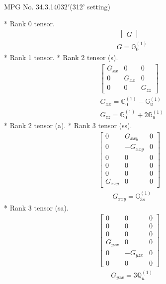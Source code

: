 \documentclass[fleqn,8pt,landscape]{jsarticle}
\begin{document}
\setcounter{MaxMatrixCols}{32}

\renewcommand{\tablename}{Table~}
\renewcommand{\figurename}{Figure~}
\begin{center}
\LARGE
MPG No. 34.3.140\quad$32'$\quad(312' setting)
\end{center}
* Rank 0 tensor.
\begin{align*}
\begin{bmatrix} G \end{bmatrix}
\end{align*}
\begin{align*}
& G = \mathbb{G}_{0}^{(1)}
\end{align*}
* Rank 1 tensor.
* Rank 2 tensor (s).
\begin{align*}
\begin{bmatrix} G_{xx} & 0 & 0 \\ 0 & G_{xx} & 0 \\ 0 & 0 & G_{zz} \end{bmatrix}
\end{align*}
\begin{align*}
& G_{xx} = \mathbb{G}_{0}^{(1)} - \mathbb{G}_{u}^{(1)} \\
& G_{zz} = \mathbb{G}_{0}^{(1)} + 2 \mathbb{G}_{u}^{(1)}
\end{align*}
* Rank 2 tensor (a).
* Rank 3 tensor (ss).
\begin{align*}
\begin{bmatrix} 0 & G_{xxy} & 0 \\ 0 & - G_{xxy} & 0 \\ 0 & 0 & 0 \\ 0 & 0 & 0 \\ 0 & 0 & 0 \\ G_{xxy} & 0 & 0 \end{bmatrix}
\end{align*}
\begin{align*}
& G_{xxy} = \mathbb{G}_{3s}^{(1)}
\end{align*}
* Rank 3 tensor (sa).
\begin{align*}
\begin{bmatrix} 0 & 0 & 0 \\ 0 & 0 & 0 \\ 0 & 0 & 0 \\ G_{yzx} & 0 & 0 \\ 0 & - G_{yzx} & 0 \\ 0 & 0 & 0 \end{bmatrix}
\end{align*}
\begin{align*}
& G_{yzx} = 3 \mathbb{Q}_{u}^{(1)}
\end{align*}
\end{document}
